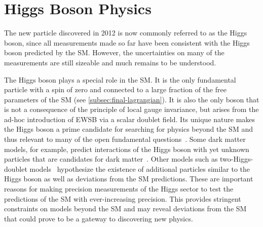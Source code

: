 \chapter{Higgs Boson Physics}
\label{chap:higgs}

The new particle discovered in 2012 is now commonly referred to as the Higgs boson, since all measurements made so far have been consistent with the Higgs boson predicted by the SM.
However, the uncertainties on many of the measurements are still sizeable and much remains to be understood. 

The Higgs boson plays a special role in the SM. 
It is the only fundamental particle with a spin of zero and connected to a large fraction of the free parameters of the SM (see \cref{subsec:final-lagrangian}). It is also the only boson that is not a consequence of the principle of local gauge invariance, but arises from the ad-hoc introduction of EWSB via a scalar doublet field. 
Its unique nature makes the Higgs boson a prime candidate for searching for physics beyond the SM and thus relevant to many of the open fundamental questions~\cite{2019BHeinemann}. 
Some dark matter models, for example, predict interactions of the Higgs boson with yet unknown particles that are candidates for dark matter~\cite{Baumgart_2009,Kaplan_2009,Dienes_2012}. 
Other models such as two-Higgs-doublet models~\cite{Branco_2012} hypothesize the existence of additional particles similar to the Higgs boson as well as deviations from the SM predictions. 
These are important reasons for making precision measurements of the Higgs sector to test the predictions of the SM with ever-increasing precision.
This provides stringent constraints on models beyond the SM and may reveal deviations from the SM that could prove to be a gateway to discovering new physics. 

